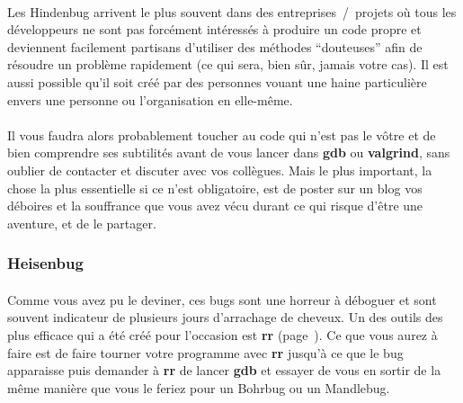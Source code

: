 \paragraph{} Les Hindenbug arrivent le plus souvent dans des
entreprises~/~projets où tous les développeurs ne sont pas forcément intéressés
à produire un code propre et deviennent facilement partisans d'utiliser des
méthodes ``douteuses'' afin de résoudre un problème rapidement (ce qui sera,
bien sûr, jamais votre cas). Il est aussi possible qu'il soit créé par des
personnes vouant une haine particulière envers une personne ou l'organisation
en elle-même.

\paragraph{} Il vous faudra alors probablement toucher au code qui n'est pas le
vôtre et de bien comprendre ses subtilités avant de vous lancer dans
\textbf{gdb} ou \textbf{valgrind}, sans oublier de contacter et discuter avec
vos collègues.  Mais le plus important, la chose la plus essentielle si ce
n'est obligatoire, est de poster sur un blog vos déboires et la souffrance que
vous avez vécu durant ce qui risque d'être une aventure, et de le partager.


\subsubsection{Heisenbug}

\paragraph{} Comme vous avez pu le deviner, ces bugs sont une horreur à
déboguer et sont souvent indicateur de plusieurs jours d'arrachage de cheveux.
Un des outils des plus efficace qui a été créé pour l'occasion est \textbf{rr}
(page~\pageref{part:rr}). Ce que vous aurez à faire est de faire tourner votre
programme avec \textbf{rr} jusqu'à ce que le bug apparaisse puis demander à
\textbf{rr} de lancer \textbf{gdb} et essayer de vous en sortir de la même
manière que vous le feriez pour un Bohrbug ou un Mandlebug.

